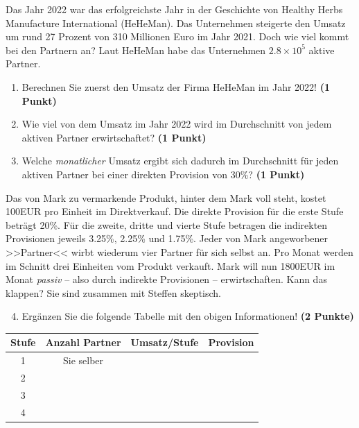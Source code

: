 \documentclass[a4paper, 9pt]{scrartcl}\usepackage[]{graphicx}\usepackage[]{xcolor}
\begin{document}
Das Jahr 2022 war das erfolgreichste Jahr in der Geschichte von Healthy Herbs Manufacture International (HeHeMan). Das Unternehmen steigerte den Umsatz um rund 27 Prozent von 310 Millionen Euro im Jahr 2021. Doch wie viel kommt bei den Partnern an? Laut HeHeMan habe das Unternehmen \ensuremath{2.8\times 10^{5}} aktive Partner.

\begin{enumerate}
\item Berechnen Sie zuerst den Umsatz der Firma HeHeMan im Jahr 2022! \textbf{(1 Punkt)}
\item Wie viel von dem Umsatz im Jahr 2022 wird im Durchschnitt von jedem aktiven Partner erwirtschaftet? \textbf{(1 Punkt)}
\item Welche \textit{monatlicher} Umsatz ergibt sich dadurch im Durchschnitt für jeden aktiven Partner bei einer direkten Provision von 30\%? \textbf{(1 Punkt)}
\end{enumerate}

Das von Mark zu vermarkende Produkt, hinter dem Mark voll steht, kostet 100EUR pro Einheit im Direktverkauf. Die direkte Provision für die erste Stufe beträgt 20\%. Für die zweite, dritte und vierte Stufe betragen die indirekten Provisionen jeweils 3.25\%, 2.25\% und 1.75\%. Jeder von Mark angeworbener >>Partner<< wirbt wiederum vier Partner für sich selbst an. Pro Monat werden im Schnitt drei Einheiten vom Produkt verkauft. Mark will nun 1800EUR im Monat \textit{passiv} -- also durch indirekte Provisionen -- erwirtschaften. Kann das klappen? Sie sind zusammen mit Steffen skeptisch.

\begin{enumerate}
  \setcounter{enumi}{3}
\item Ergänzen Sie die folgende Tabelle mit den obigen Informationen! \textbf{(2 Punkte)}
\end{enumerate}

\begin{center}
\begin{tabular}{c|c|c|c}
  \toprule
  \textbf{Stufe} & \textbf{Anzahl Partner}  & \textbf{Umsatz/Stufe} & \textbf{Provision}\\
  \midrule
  1 & Sie selber  &  & \\ \midrule
  2 &   &  &  \\ \midrule
  3 &   &  &  \\ \midrule
  4 &   &  &  \\
  \bottomrule
\end{tabular}
\end{center}
\end{document}
